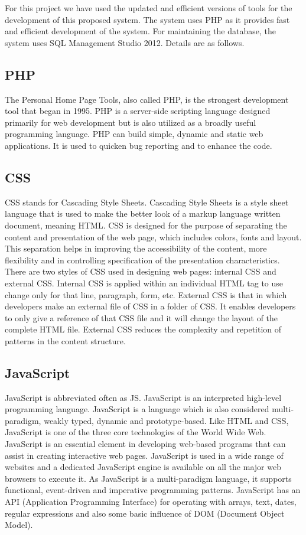 For this project we have used the updated and efficient versions of tools for the development of this proposed system. The system uses PHP as it provides fast and efficient development of the system. For maintaining the database, the system uses SQL Management Studio 2012. Details are as follows.

\subsection{PHP}

The Personal Home Page Tools, also called PHP, is the strongest development tool that began in 1995. PHP is a server-side scripting language designed primarily for web development but is also utilized as a broadly useful programming language. PHP can build simple, dynamic and static web applications. It is used to quicken bug reporting and to enhance the code.

\subsection{CSS}

CSS stands for Cascading Style Sheets. Cascading Style Sheets is a style sheet language that is used to make the better look of a markup language written document, meaning HTML. CSS is designed for the purpose of separating the content and presentation of the web page, which includes colors, fonts and layout. This separation helps in improving the accessibility of the content, more flexibility and in controlling specification of the presentation characteristics. There are two styles of CSS used in designing web pages: internal CSS and external CSS. Internal CSS is applied within an individual HTML tag to use change only for that line, paragraph, form, etc. External CSS is that in which developers make an external file of CSS in a folder of CSS. It enables developers to only give a reference of that CSS file and it will change the layout of the complete HTML file. External CSS reduces the complexity and repetition of patterns in the content structure.

\subsection{JavaScript}

JavaScript is abbreviated often as JS. JavaScript is an interpreted high-level programming language. JavaScript is a language which is also considered multi-paradigm, weakly typed, dynamic and prototype-based. Like HTML and CSS, JavaScript is one of the three core technologies of the World Wide Web. JavaScript is an essential element in developing web-based programs that can assist in creating interactive web pages. JavaScript is used in a wide range of websites and a dedicated JavaScript engine is available on all the major web browsers to execute it. As JavaScript is a multi-paradigm language, it supports functional, event-driven and imperative programming patterns. JavaScript has an API (Application Programming Interface) for operating with arrays, text, dates, regular expressions and also some basic influence of DOM (Document Object Model).

